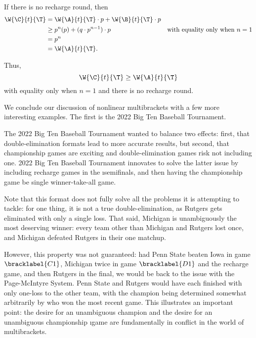{{        If there is no recharge round, then
        \begin{align*}
            \W{\C}{t}{\T} &= \W{\A}{t}{\T} \cdot p + \W{\B}{t}{\T} \cdot p\\
            &\geq p^n(p) + (q \cdot p^{n-1}) \cdot p &\textrm{with equality only when $n=1$}\\
            &= p^n\\
            &= \W{\A}{t}{\T}.
        \end{align*}
        

        Thus, $$\W{\C}{t}{\T} \geq \W{\A}{t}{\T}$$ with equality only when $n=1$ and there is no recharge round.
    }{}

    We conclude our discussion of nonlinear multibrackets with a few more interesting examples. The first is the 2022 Big Ten Baseball Tournament.


    The 2022 Big Ten Baseball Tournament wanted to balance two effects: first, that double-elimination formats lead to more accurate results, but second, that championship games are exciting and double-elimination games risk not including one. 2022 Big Ten Baseball Tournament innovates to solve the latter issue by including recharge games in the \i{semifinals}, and then having the championship game be single winner-take-all game.

    Note that this format does not fully solve all the problems it is attempting to tackle: for one thing, it is not a true double-elimination, as Rutgers gets eliminated with only a single loss. That said, Michigan is unambiguously the most deserving winner: every team other than Michigan and Rutgers lost once, and Michigan defeated Rutgers in their one matchup.
    
    However, this property was not guaranteed: had Penn State beaten Iowa in game $\bracklabel{C1}$, Michigan twice in game $\bracklabel{D1}$ and the recharge game, and then Rutgers in the final, we would be back to the issue with the Page-McIntyre System. Penn State and Rutgers would have each finished with only one-loss to the other team, with the champion being determined somewhat arbitrarily by who won the most recent game. This illustrates an important point: the desire for an unambiguous champion and the desire for an unambiguous championship \i{game} are fundamentally in conflict in the world of multibrackets.

}
